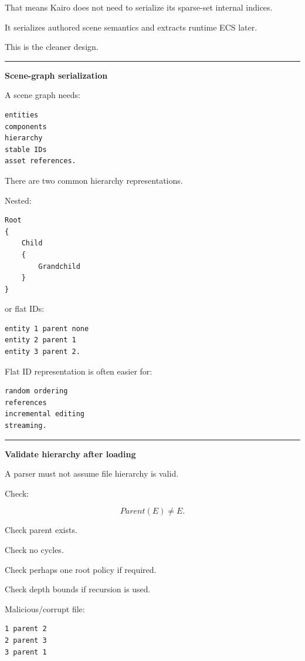 That means Kairo does not need to serialize its sparse-set internal indices.

It serializes authored scene semantics and extracts runtime ECS later.

This is the cleaner design.

\begin{center}\rule{0.5\linewidth}{0.5pt}\end{center}

\textbf{Scene-graph serialization}

A scene graph needs:

\begin{verbatim}
entities
components
hierarchy
stable IDs
asset references.
\end{verbatim}

There are two common hierarchy representations.

Nested:

\begin{verbatim}
Root
{
    Child
    {
        Grandchild
    }
}
\end{verbatim}

or flat IDs:

\begin{verbatim}
entity 1 parent none
entity 2 parent 1
entity 3 parent 2.
\end{verbatim}

Flat ID representation is often easier for:

\begin{verbatim}
random ordering
references
incremental editing
streaming.
\end{verbatim}

\begin{center}\rule{0.5\linewidth}{0.5pt}\end{center}

\textbf{Validate hierarchy after loading}

A parser must not assume file hierarchy is valid.

Check:

\[
Parent(E)\neq E.
\]

Check parent exists.

Check no cycles.

Check perhaps one root policy if required.

Check depth bounds if recursion is used.

Malicious/corrupt file:

\begin{verbatim}
1 parent 2
2 parent 3
3 parent 1
\end{verbatim}

